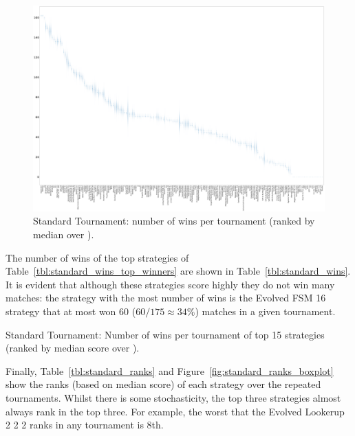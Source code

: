 \documentclass{article}
\begin{document}
\begin{landscape}
    \begin{figure}[!hbtp]
        \centering
        \includegraphics[width=\paperwidth]{./assets/standard_wins_boxplots.pdf}
        \caption{Standard Tournament: number of wins per tournament (ranked by
        median over
        \protecttournaments).}
        \label{fig:standard_winplot}
    \end{figure}
\end{landscape}

The number of wins of the top strategies of Table~\ref{tbl:standard_wins_top_winners} are
shown in Table~\ref{tbl:standard_wins}. It is evident that although these
strategies score highly they do not win many matches: the strategy with the most
number of wins is the Evolved FSM 16 strategy that at most won 60
(\(60/175\approx34\%\)) matches in a given tournament.

\begin{table}[!hbtp]
    \centering
        
        \caption{Standard Tournament: Number of wins per tournament
        of top 15 strategies (ranked by median score over
        \protecttournaments).}
        \label{tbl:standard_wins}
\end{table}


Finally, Table~\ref{tbl:standard_ranks} and
Figure~\ref{fig:standard_ranks_boxplot} show the ranks (based on median score)
of each strategy over the repeated tournaments. Whilst there is some
stochasticity, the top three strategies almost always rank in the top three. For
example, the worst that the Evolved Lookerup 2 2 2 ranks in any tournament
is 8th.
\end{document}
